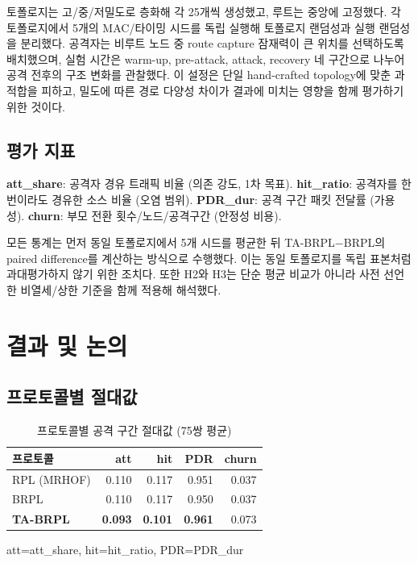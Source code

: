 \documentclass[10pt,a4paper,twocolumn]{article}
\begin{document}
토폴로지는 고/중/저밀도로 층화해 각 25개씩 생성했고,
루트는 중앙에 고정했다.
각 토폴로지에서 5개의 MAC/타이밍 시드를 독립 실행해
토폴로지 랜덤성과 실행 랜덤성을 분리했다.
공격자는 비루트 노드 중 route capture 잠재력이 큰 위치를 선택하도록 배치했으며,
실험 시간은 warm-up, pre-attack, attack, recovery 네 구간으로 나누어
공격 전후의 구조 변화를 관찰했다.
이 설정은 단일 hand-crafted topology에 맞춘 과적합을 피하고,
밀도에 따른 경로 다양성 차이가 결과에 미치는 영향을 함께 평가하기 위한 것이다.

\subsection{평가 지표}

\textbf{att\_share}: 공격자 경유 트래픽 비율 (의존 강도, 1차 목표).
\textbf{hit\_ratio}: 공격자를 한 번이라도 경유한 소스 비율 (오염 범위).
\textbf{PDR\_dur}: 공격 구간 패킷 전달률 (가용성).
\textbf{churn}: 부모 전환 횟수/노드/공격구간 (안정성 비용).

모든 통계는 먼저 동일 토폴로지에서 5개 시드를 평균한 뒤
TA-BRPL$-$BRPL의 paired difference를 계산하는 방식으로 수행했다.
이는 동일 토폴로지를 독립 표본처럼 과대평가하지 않기 위한 조치다.
또한 H2와 H3는 단순 평균 비교가 아니라
사전 선언한 비열세/상한 기준을 함께 적용해 해석했다.


\section{결과 및 논의}
\label{sec:results}

\subsection{프로토콜별 절대값}

\begin{table}[!tbp]
\centering\small
\caption{프로토콜별 공격 구간 절대값 (75쌍 평균)}
\label{tab:absolute}
\begin{tabular}{lrrrr}
\toprule
프로토콜 & att & hit & PDR & churn \\
\midrule
RPL (MRHOF)       & 0.110 & 0.117 & 0.951 & 0.037 \\
BRPL              & 0.110 & 0.117 & 0.950 & 0.037 \\
\textbf{TA-BRPL}  & \textbf{0.093} & \textbf{0.101}
                  & \textbf{0.961} & 0.073 \\
\bottomrule
\end{tabular}
{\footnotesize att=att\_share, hit=hit\_ratio, PDR=PDR\_dur}
\end{table}
\end{document}
